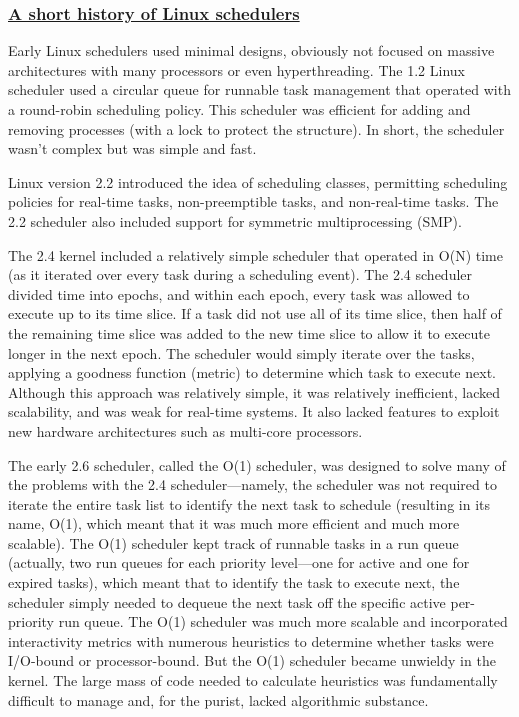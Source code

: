 \documentclass{article}
\begin{document}
\subsubsection{\underline{A short history of Linux schedulers}}

Early Linux schedulers used minimal designs, obviously not focused on massive architectures with many processors or even hyperthreading. The 1.2 Linux scheduler used a circular queue for runnable task management that operated with a round-robin scheduling policy. This scheduler was efficient for adding and removing processes (with a lock to protect the structure). In short, the scheduler wasn’t complex but was simple and fast.

Linux version 2.2 introduced the idea of scheduling classes, permitting scheduling policies for real-time tasks, non-preemptible tasks, and non-real-time tasks. The 2.2 scheduler also included support for symmetric multiprocessing (SMP).

The 2.4 kernel included a relatively simple scheduler that operated in O(N) time (as it iterated over every task during a scheduling event). The 2.4 scheduler divided time into epochs, and within each epoch, every task was allowed to execute up to its time slice. If a task did not use all of its time slice, then half of the remaining time slice was added to the new time slice to allow it to execute longer in the next epoch. The scheduler would simply iterate over the tasks, applying a goodness function (metric) to determine which task to execute next. Although this approach was relatively simple, it was relatively inefficient, lacked scalability, and was weak for real-time systems. It also lacked features to exploit new hardware architectures such as multi-core processors.

The early 2.6 scheduler, called the O(1) scheduler, was designed to solve many of the problems with the 2.4 scheduler—namely, the scheduler was not required to iterate the entire task list to identify the next task to schedule (resulting in its name, O(1), which meant that it was much more efficient and much more scalable). The O(1) scheduler kept track of runnable tasks in a run queue (actually, two run queues for each priority level—one for active and one for expired tasks), which meant that to identify the task to execute next, the scheduler simply needed to dequeue the next task off the specific active per-priority run queue. The O(1) scheduler was much more scalable and incorporated interactivity metrics with numerous heuristics to determine whether tasks were I/O-bound or processor-bound. But the O(1) scheduler became unwieldy in the kernel. The large mass of code needed to calculate heuristics was fundamentally difficult to manage and, for the purist, lacked algorithmic substance.
\end{document}
